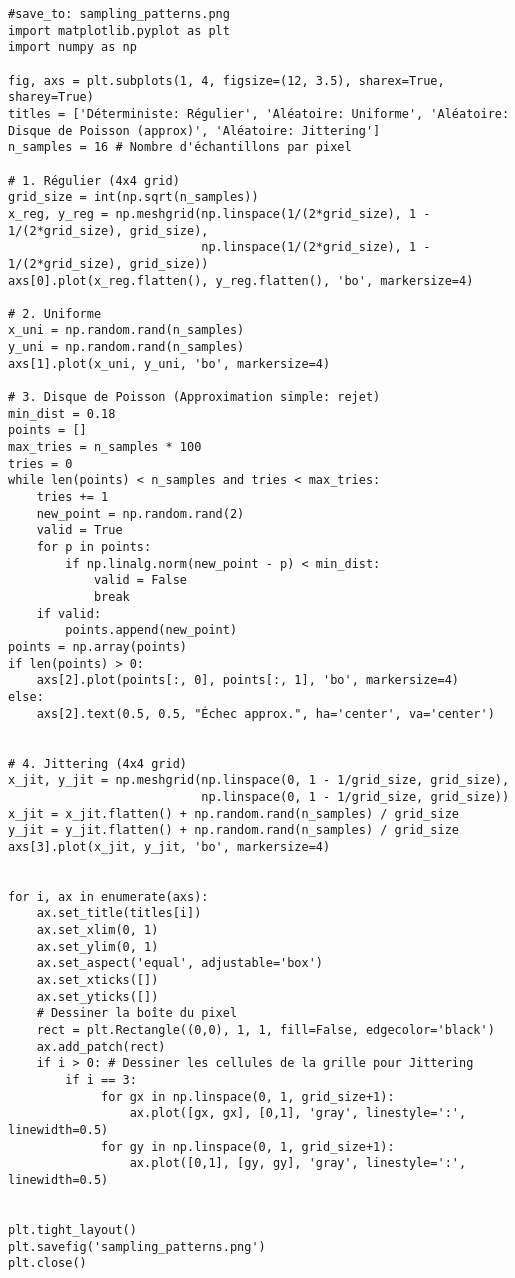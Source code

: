 \documentclass{article}
\begin{document}
\begin{verbatim}
#save_to: sampling_patterns.png
import matplotlib.pyplot as plt
import numpy as np

fig, axs = plt.subplots(1, 4, figsize=(12, 3.5), sharex=True, sharey=True)
titles = ['Déterministe: Régulier', 'Aléatoire: Uniforme', 'Aléatoire: Disque de Poisson (approx)', 'Aléatoire: Jittering']
n_samples = 16 # Nombre d'échantillons par pixel

# 1. Régulier (4x4 grid)
grid_size = int(np.sqrt(n_samples))
x_reg, y_reg = np.meshgrid(np.linspace(1/(2*grid_size), 1 - 1/(2*grid_size), grid_size),
                           np.linspace(1/(2*grid_size), 1 - 1/(2*grid_size), grid_size))
axs[0].plot(x_reg.flatten(), y_reg.flatten(), 'bo', markersize=4)

# 2. Uniforme
x_uni = np.random.rand(n_samples)
y_uni = np.random.rand(n_samples)
axs[1].plot(x_uni, y_uni, 'bo', markersize=4)

# 3. Disque de Poisson (Approximation simple: rejet)
min_dist = 0.18
points = []
max_tries = n_samples * 100
tries = 0
while len(points) < n_samples and tries < max_tries:
    tries += 1
    new_point = np.random.rand(2)
    valid = True
    for p in points:
        if np.linalg.norm(new_point - p) < min_dist:
            valid = False
            break
    if valid:
        points.append(new_point)
points = np.array(points)
if len(points) > 0:
    axs[2].plot(points[:, 0], points[:, 1], 'bo', markersize=4)
else:
    axs[2].text(0.5, 0.5, "Échec approx.", ha='center', va='center')


# 4. Jittering (4x4 grid)
x_jit, y_jit = np.meshgrid(np.linspace(0, 1 - 1/grid_size, grid_size),
                           np.linspace(0, 1 - 1/grid_size, grid_size))
x_jit = x_jit.flatten() + np.random.rand(n_samples) / grid_size
y_jit = y_jit.flatten() + np.random.rand(n_samples) / grid_size
axs[3].plot(x_jit, y_jit, 'bo', markersize=4)


for i, ax in enumerate(axs):
    ax.set_title(titles[i])
    ax.set_xlim(0, 1)
    ax.set_ylim(0, 1)
    ax.set_aspect('equal', adjustable='box')
    ax.set_xticks([])
    ax.set_yticks([])
    # Dessiner la boîte du pixel
    rect = plt.Rectangle((0,0), 1, 1, fill=False, edgecolor='black')
    ax.add_patch(rect)
    if i > 0: # Dessiner les cellules de la grille pour Jittering
        if i == 3:
             for gx in np.linspace(0, 1, grid_size+1):
                 ax.plot([gx, gx], [0,1], 'gray', linestyle=':', linewidth=0.5)
             for gy in np.linspace(0, 1, grid_size+1):
                 ax.plot([0,1], [gy, gy], 'gray', linestyle=':', linewidth=0.5)


plt.tight_layout()
plt.savefig('sampling_patterns.png')
plt.close()
\end{verbatim}
\end{document}
